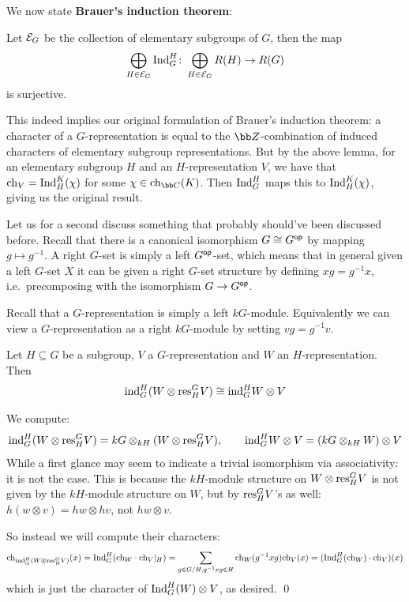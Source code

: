 We now state {\bf Brauer's induction theorem}:

\bthrm[title=Brauer's induction theorem]

    Let ${\cal E}_G$ be the collection of elementary subgroups of $G$, then the map
    $$ \bigoplus_{H\in{\cal E}_G}{\rm Ind}^H_G\colon\bigoplus_{H\in{\cal E}_G}R(H)\to R(G) $$
    is surjective.

\ethrm

This indeed implies our original formulation of Brauer's induction theorem: a character of a $G$-representation is equal to the $\bZ$-combination of induced characters of elementary subgroup representations.
But by the above lemma, for an elementary subgroup $H$ and an $H$-representation $V$, we have that ${\rm ch}_V={\rm Ind}^K_H(\chi)$ for some $\chi\in\ch_\bC(K)$.
Then ${\rm Ind}^H_G$ maps this to ${\rm Ind}^K_H(\chi)$, giving us the original result.

Let us for a second discuss something that probably should've been discussed before.
Recall that there is a canonical isomorphism $G\cong G^{\sf op}$ by mapping $g\mapsto g^{-1}$.
A right $G$-set is simply a left $G^{\sf op}$-set, which means that in general given a left $G$-set $X$ it can be given a right $G$-set structure by defining $xg=g^{-1}x$, i.e.\ precomposing with the isomorphism $G\to G^{\sf op}$.

Recall that a $G$-representation is simply a left $kG$-module.
Equivalently we can view a $G$-representation as a right $kG$-module by setting $vg=g^{-1}v$.

\blemm

    Let $H\subseteq G$ be a subgroup, $V$ a $G$-representation and $W$ an $H$-representation.
    Then
    $$ {\rm ind}^H_G(W\otimes{\rm res}^G_HV) \cong {\rm ind}^H_GW\otimes V $$

\elemm

\bproof

    We compute:
    $$ {\rm ind}^H_G(W\otimes{\rm res}^G_HV) = kG\otimes_{kH}(W\otimes{\rm res}^G_HV),\qquad {\rm ind}^H_GW\otimes V = (kG\otimes_{kH}W)\otimes V $$
    While a first glance may seem to indicate a trivial isomorphism via associativity: it is not the case.
    This is because the $kH$-module structure on $W\otimes{\rm res}^G_HV$ is not given by the $kH$-module structure on $W$, but by ${\rm res}^G_HV$'s as well: $h(w\otimes v)=hw\otimes hv$, not $hw\otimes v$.

    So instead we will compute their characters:
    $$ {\rm ch}_{{\rm ind}^H_G(W\otimes{\rm res}^G_HV)}(x) = {\rm Ind}^H_G({\rm ch}_W\cdot{\rm ch}_V|_H) = \sum_{g\in G/H,g^{-1}xg\in H}{\rm ch}_W(g^{-1}xg){\rm ch}_V(x) = ({\rm Ind}^H_G({\rm ch}_W)\cdot{\rm ch}_V)(x) $$
    which is just the character of ${\rm Ind}^H_G(W)\otimes V$, as desired.
    \qed

